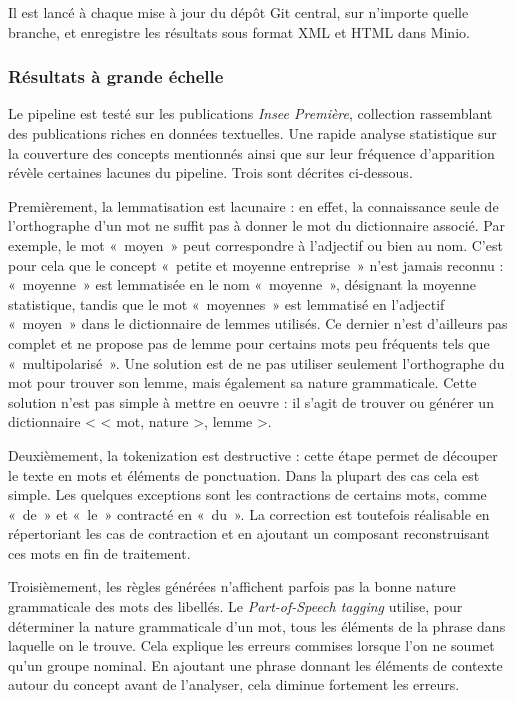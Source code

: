 Il est lancé à chaque mise à jour du dépôt Git central, sur n'importe quelle branche, et enregistre les résultats sous format XML et HTML dans Minio.
\newline

\subsubsection*{Résultats à grande échelle}
Le pipeline est testé sur les publications \textit{Insee Première}, collection rassemblant des publications riches en données textuelles. Une rapide analyse statistique sur la couverture des concepts mentionnés ainsi que sur leur fréquence d'apparition révèle certaines lacunes du pipeline. Trois sont décrites ci-dessous.
\newline

Premièrement, la lemmatisation est lacunaire : en effet, la connaissance seule de l'orthographe d'un mot ne suffit pas à donner le mot du dictionnaire associé. Par exemple, le mot «~moyen~» peut correspondre à l'adjectif ou bien au nom. C'est pour cela que le concept «~petite et moyenne entreprise~» n'est jamais reconnu : «~moyenne~» est lemmatisée en le nom «~moyenne~», désignant la moyenne statistique, tandis que le mot «~moyennes~» est lemmatisé en l'adjectif «~moyen~» dans le dictionnaire de lemmes utilisés. Ce dernier n'est d'ailleurs pas complet et ne propose pas de lemme pour certains mots peu fréquents tels que «~multipolarisé~». Une solution est de ne pas utiliser seulement l'orthographe du mot pour trouver son lemme, mais également sa nature grammaticale. Cette solution n'est pas simple à mettre en oeuvre : il s'agit de trouver ou générer un dictionnaire < < mot, nature >, lemme >.
\newline

Deuxièmement, la tokenization est destructive : cette étape permet de découper le texte en mots et éléments de ponctuation. Dans la plupart des cas cela est simple. Les quelques exceptions sont les contractions de certains mots, comme «~de~» et «~le~» contracté en «~du~». La correction est toutefois réalisable en répertoriant les cas de contraction et en ajoutant un composant reconstruisant ces mots en fin de traitement.
\newline

Troisièmement, les règles générées n'affichent parfois pas la bonne nature grammaticale des mots des libellés. Le \textit{Part-of-Speech tagging} utilise, pour déterminer la nature grammaticale d'un mot, tous les éléments de la phrase dans laquelle on le trouve. Cela explique les erreurs commises lorsque l'on ne soumet qu'un groupe nominal. En ajoutant une phrase donnant les éléments de contexte autour du concept avant de l'analyser, cela diminue fortement les erreurs.
\newline

